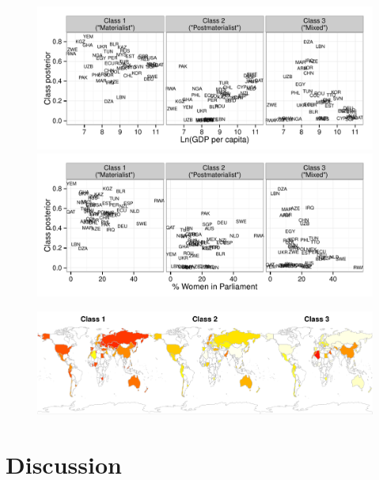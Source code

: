 \documentclass[letterpaper,12pt]{article}
\begin{document}
\begin{figure}
	\includegraphics[width=\textwidth]{figures/gdp-posterior.pdf}
	
	\includegraphics[width=\textwidth]{figures/women-posterior.pdf}

	\caption{\label{fig:posterior}}
\end{figure}

\begin{figure}
	\includegraphics[width=\textwidth]{figures/maps.pdf}
	
	\caption{\label{fig:maps}}
\end{figure}

\section{Discussion}





\end{document}

